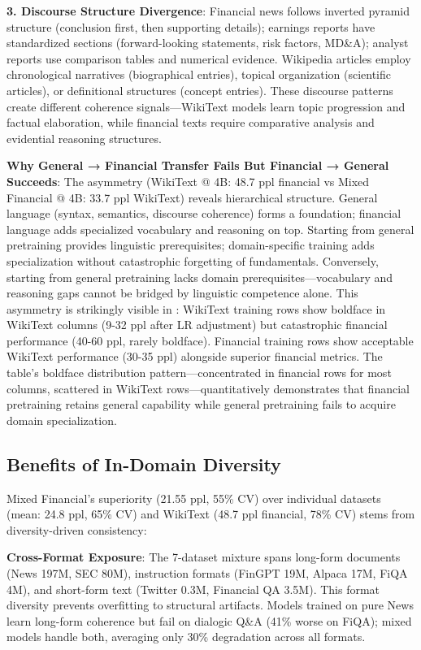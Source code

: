 \textbf{3. Discourse Structure Divergence}: Financial news follows inverted pyramid structure (conclusion first, then supporting details); earnings reports have standardized sections (forward-looking statements, risk factors, MD\&A); analyst reports use comparison tables and numerical evidence. Wikipedia articles employ chronological narratives (biographical entries), topical organization (scientific articles), or definitional structures (concept entries). These discourse patterns create different coherence signals—WikiText models learn topic progression and factual elaboration, while financial texts require comparative analysis and evidential reasoning structures.

\textbf{Why General → Financial Transfer Fails But Financial → General Succeeds}: The asymmetry (WikiText @ 4B: 48.7 ppl financial vs Mixed Financial @ 4B: 33.7 ppl WikiText) reveals hierarchical structure. General language (syntax, semantics, discourse coherence) forms a foundation; financial language adds specialized vocabulary and reasoning on top. Starting from general pretraining provides linguistic prerequisites; domain-specific training adds specialization without catastrophic forgetting of fundamentals. Conversely, starting from general pretraining lacks domain prerequisites—vocabulary and reasoning gaps cannot be bridged by linguistic competence alone. This asymmetry is strikingly visible in : WikiText training rows show boldface in WikiText columns (9-32 ppl after LR adjustment) but catastrophic financial performance (40-60 ppl, rarely boldface). Financial training rows show acceptable WikiText performance (30-35 ppl) alongside superior financial metrics. The table's boldface distribution pattern—concentrated in financial rows for most columns, scattered in WikiText rows—quantitatively demonstrates that financial pretraining retains general capability while general pretraining fails to acquire domain specialization.

\subsection{Benefits of In-Domain Diversity}

Mixed Financial's superiority (21.55 ppl, 55\% CV) over individual datasets (mean: 24.8 ppl, 65\% CV) and WikiText (48.7 ppl financial, 78\% CV) stems from diversity-driven consistency:

\textbf{Cross-Format Exposure}: The 7-dataset mixture spans long-form documents (News 197M, SEC 80M), instruction formats (FinGPT 19M, Alpaca 17M, FiQA 4M), and short-form text (Twitter 0.3M, Financial QA 3.5M). This format diversity prevents overfitting to structural artifacts. Models trained on pure News learn long-form coherence but fail on dialogic Q\&A (41\% worse on FiQA); mixed models handle both, averaging only 30\% degradation across all formats.

